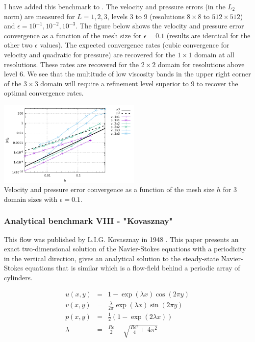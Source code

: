 I have added this benchmark to \aspect{}.
The velocity and pressure errors (in the $L_2$ norm) are measured for $L=1,2,3$, 
levels 3 to 9 (resolutions $8\times8$ to $512\times 512$)  
and $\epsilon=10^{-1},10^{-2},10^{-3}$. The figure below shows the velocity and pressure 
error convergence as a function of the mesh size for $\epsilon=0.1$ (results are identical for 
the other two $\epsilon$ values).
The expected convergence rates (cubic convergence for velocity and quadratic for pressure) are 
recovered for the $1\times 1$ domain at all resolutions. These rates are recovered for 
the $2\times 2$ domain for resolutions above level 6. We see that 
the multitude of low viscosity bands in the upper right corner of the $3\times 3$ domain 
will require a refinement level superior to 9 to recover the optimal convergence rates. 

\begin{center}
\includegraphics[width=7cm]{images/mms/mms7_errors}\\
{\captionfont Velocity and pressure error convergence as a function of the mesh size $h$ for 3 domain sizes with $\epsilon=0.1$.}
\end{center}


\bscthesis {}

\subsubsection{Analytical benchmark VIII \label{mms8} - "Kovasznay"}

This flow was published by L.I.G. Kovasznay in 1948 \cite{kova48}. 
This paper presents an exact two-dimensional solution of the Navier-Stokes equations 
with a periodicity in the vertical direction, 
gives an analytical solution to the steady-state Navier-Stokes equations that is similar
which is a flow-field behind a periodic array of cylinders.

\begin{eqnarray}
u(x,y)&=&1-\exp(\lambda x) \cos (2\pi y)\\
v(x,y)&=&\frac{\lambda}{2\pi} \exp(\lambda x) \sin (2 \pi y)\\
p(x,y) &=& \frac{1}{2}(1-\exp (2\lambda x)) \\
\lambda&=&\frac{Re}{2}-\sqrt{\frac{Re^2}{4}+4\pi^2} 
\end{eqnarray}

